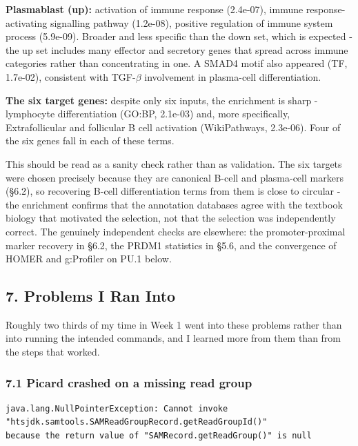 \documentclass[
  11pt,
  a4paper,
]{article}
\begin{document}
\textbf{Plasmablast (up):} activation of immune response (2.4e-07),
immune response-activating signalling pathway (1.2e-08), positive
regulation of immune system process (5.9e-09). Broader and less specific
than the down set, which is expected - the up set includes many effector
and secretory genes that spread across immune categories rather than
concentrating in one. A SMAD4 motif also appeared (TF, 1.7e-02),
consistent with TGF-\(\beta\) involvement in plasma-cell
differentiation.

\textbf{The six target genes:} despite only six inputs, the enrichment
is sharp - lymphocyte differentiation (GO:BP, 2.1e-03) and, more
specifically, Extrafollicular and follicular B cell activation
(WikiPathways, 2.3e-06). Four of the six genes fall in each of these
terms.

This should be read as a sanity check rather than as validation. The six
targets were chosen precisely because they are canonical B-cell and
plasma-cell markers (§6.2), so recovering B-cell differentiation terms
from them is close to circular - the enrichment confirms that the
annotation databases agree with the textbook biology that motivated the
selection, not that the selection was independently correct. The
genuinely independent checks are elsewhere: the promoter-proximal marker
recovery in §6.2, the PRDM1 statistics in §5.6, and the convergence of
HOMER and g:Profiler on PU.1 below.

\hypertarget{problems-i-ran-into}{%
\subsection{7. Problems I Ran Into}\label{problems-i-ran-into}}

Roughly two thirds of my time in Week 1 went into these problems rather
than into running the intended commands, and I learned more from them
than from the steps that worked.

\hypertarget{picard-crashed-on-a-missing-read-group}{%
\subsubsection{7.1 Picard crashed on a missing read
group}\label{picard-crashed-on-a-missing-read-group}}

\begin{verbatim}
java.lang.NullPointerException: Cannot invoke
"htsjdk.samtools.SAMReadGroupRecord.getReadGroupId()"
because the return value of "SAMRecord.getReadGroup()" is null
\end{verbatim}
\end{document}
